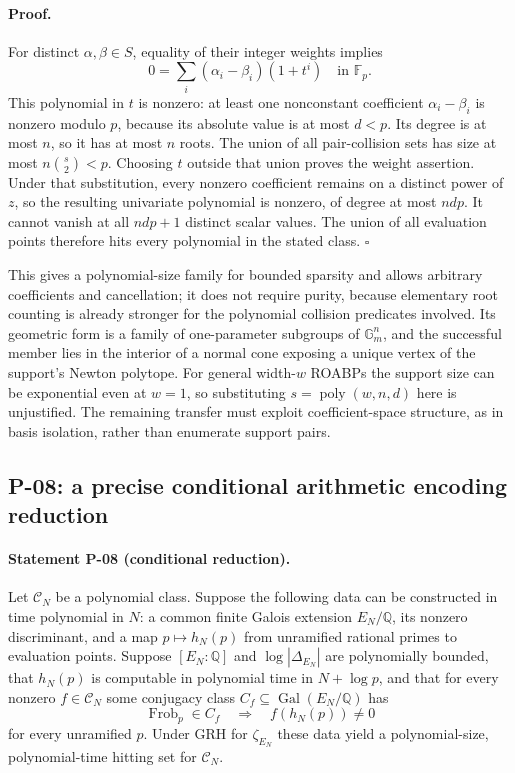 \paragraph{Proof.}
For distinct $\alpha,\beta\in S$, equality of their integer weights implies
\[
 0=\sum_i(\alpha_i-\beta_i)(1+t^i)\quad\text{in }\mathbb F_p.
\]
This polynomial in $t$ is nonzero: at least one nonconstant coefficient $\alpha_i-\beta_i$ is nonzero modulo $p$, because its absolute value is at most $d<p$. Its degree is at most $n$, so it has at most $n$ roots. The union of all pair-collision sets has size at most $n\binom{s}{2}<p$. Choosing $t$ outside that union proves the weight assertion. Under that substitution, every nonzero coefficient remains on a distinct power of $z$, so the resulting univariate polynomial is nonzero, of degree at most $ndp$. It cannot vanish at all $ndp+1$ distinct scalar values. The union of all evaluation points therefore hits every polynomial in the stated class. $\square$

This gives a polynomial-size family for bounded sparsity and allows arbitrary coefficients and cancellation; it does not require purity, because elementary root counting is already stronger for the polynomial collision predicates involved. Its geometric form is a family of one-parameter subgroups of $\mathbb G_m^n$, and the successful member lies in the interior of a normal cone exposing a unique vertex of the support's Newton polytope. For general width-$w$ ROABPs the support size can be exponential even at $w=1$, so substituting $s=\operatorname{poly}(w,n,d)$ here is unjustified. The remaining transfer must exploit coefficient-space structure, as in basis isolation, rather than enumerate support pairs.

\subsection{P-08: a precise conditional arithmetic encoding reduction}
\paragraph{Statement P-08 (conditional reduction).}
Let $\mathcal C_N$ be a polynomial class. Suppose the following data can be constructed in time polynomial in $N$: a common finite Galois extension $E_N/\mathbb Q$, its nonzero discriminant, and a map $p\mapsto h_N(p)$ from unramified rational primes to evaluation points. Suppose $[E_N:\mathbb Q]$ and $\log|\Delta_{E_N}|$ are polynomially bounded, that $h_N(p)$ is computable in polynomial time in $N+\log p$, and that for every nonzero $f\in\mathcal C_N$ some conjugacy class $C_f\subseteq\operatorname{Gal}(E_N/\mathbb Q)$ has
\[
 \operatorname{Frob}_p\in C_f\quad\Longrightarrow\quad f(h_N(p))\ne0
\]
for every unramified $p$. Under GRH for $\zeta_{E_N}$ these data yield a polynomial-size, polynomial-time hitting set for $\mathcal C_N$.
